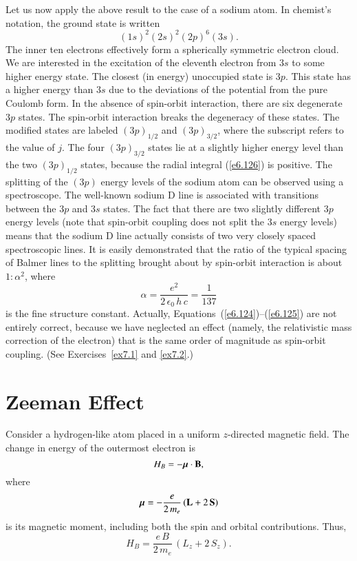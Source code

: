 Let us now apply the above result to the case of a sodium atom. 
In chemist's notation, the ground state is written
\begin{equation}
(1s)^2 (2s)^2(2p)^6(3s).
\end{equation}
The inner ten electrons effectively form a spherically symmetric electron
cloud. We are interested in the excitation of the eleventh electron
from $3s$ to some higher energy state. The closest (in energy) unoccupied
state is $3p$. This state has a higher energy than $3s$ due to the deviations
of the potential from the pure Coulomb form. In the absence of spin-orbit
interaction, there are six degenerate $3p$ states. The spin-orbit
interaction breaks the degeneracy of these states. The modified states are
labeled $(3p)_{1/2}$ and $(3p)_{3/2}$, where the subscript refers to the
value of $j$. The four $(3p)_{3/2}$ states lie at a slightly higher
energy level than the two $(3p)_{1/2}$ states,
because the radial integral (\ref{e6.126}) is positive.  The splitting of
the $(3p)$ energy levels of the sodium atom can be observed
using a  spectroscope.
The well-known sodium D line is associated with transitions between 
the $3p$ and $3s$ states. The fact that there are two  slightly different
$3p$ energy levels (note that spin-orbit coupling does not split
the $3s$ energy levels) means that the sodium D line actually consists
of two very closely spaced spectroscopic lines. It is easily
demonstrated that the ratio of the typical spacing of
 Balmer lines to the splitting 
brought about by spin-orbit interaction is about $1 : \alpha^2$,
where
\begin{equation}
\alpha = \frac{e^2}{2\,\epsilon_0\, h\, c} = \frac{1}{137}
\end{equation}
is the  fine structure constant. Actually, Equations~(\ref{e6.124})--(\ref{e6.125}) are not
entirely correct, because  we have neglected an effect (namely, the
relativistic mass correction of the electron) that  is the same
order of magnitude as spin-orbit coupling. (See Exercises~\ref{ex7.1} and \ref{ex7.2}.)

\section{Zeeman Effect}
Consider a hydrogen-like atom placed in a uniform $z$-directed
magnetic field. The change in energy of the outermost electron is
\begin{equation}
H_B = -\mbox{\boldmath$\mu$} \cdot  {\bf B},
\end{equation}
where 
\begin{equation}
\mbox{\boldmath$\mu$} = - \frac{e}{2\,m_e}\, ({\bf L} + 2 \,{\bf S})
\end{equation}
is its magnetic moment, including both the spin  and
orbital  contributions.
Thus,
\begin{equation}
H_B = \frac{e\, B}{2\, m_e}\, (L_z + 2\, S_z).
\end{equation}

